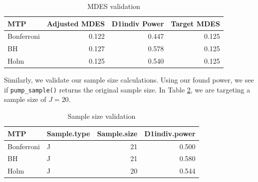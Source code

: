 \documentclass{article}
\begin{document}
\begin{table}[h!]
\centering
\begin{tabular}{lrrr}
\toprule
MTP & Adjusted MDES & D1indiv Power & Target MDES\\
\midrule
Bonferroni & 0.122 & 0.447 & 0.125\\
BH & 0.127 & 0.578 & 0.125\\
Holm & 0.125 & 0.540 & 0.125\\
\bottomrule
\end{tabular}
\label{tab:mdes}
\caption{MDES validation}
\end{table}

Similarly, we validate our sample size calculations. Using our found
power, we see if \texttt{pump\_sample()} returns the original sample
size. In Table \ref{tab:ss}, we are targeting a sample size of
\(J = 20\).

\begin{table}[h!]
\centering
\begin{tabular}{llrr}
\toprule
MTP & Sample.type & Sample.size & D1indiv.power\\
\midrule
Bonferroni & J & 21 & 0.500\\
BH & J & 21 & 0.580\\
Holm & J & 20 & 0.544\\
\bottomrule
\end{tabular}
\label{tab:ss}
\caption{Sample size validation}
\end{table}
\end{document}
